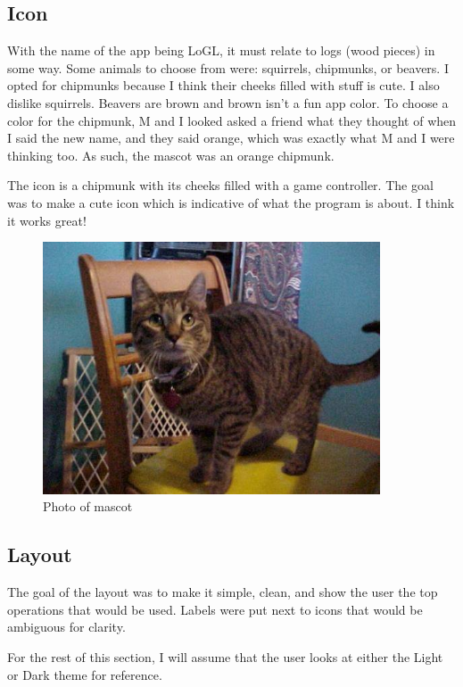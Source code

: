 \subsection{Icon}

With the name of the app being LoGL, it must relate to logs (wood
pieces) in some way.
Some animals to choose from were: squirrels, chipmunks, or beavers. I
opted for chipmunks because I think their cheeks filled with stuff is
cute. I also dislike squirrels. Beavers are brown and brown
isn't a fun app color. To choose a color for the chipmunk, M and I
looked asked a friend what they thought of when I said the new name,
and they said orange, which was exactly what M and I were thinking too.
As such, the mascot was an orange chipmunk.

The icon is a chipmunk with its cheeks filled with a game controller.
The goal was to make a cute icon which is indicative of what the
program is about. I think it works great!

\begin{figure}[htb]
	\centering
	\includegraphics[width=10cm]{./Images/cats_00001.jpg}
	\caption{Photo of mascot}
	\label{fig:AppLD}
\end{figure}


\subsection{Layout}

The goal of the layout was to make it simple, clean, and show the
user the top operations that would be used.
Labels were put next to icons that would be ambiguous for clarity.

For the rest of this section, I will assume that the user looks at
either the Light or Dark theme for reference.

